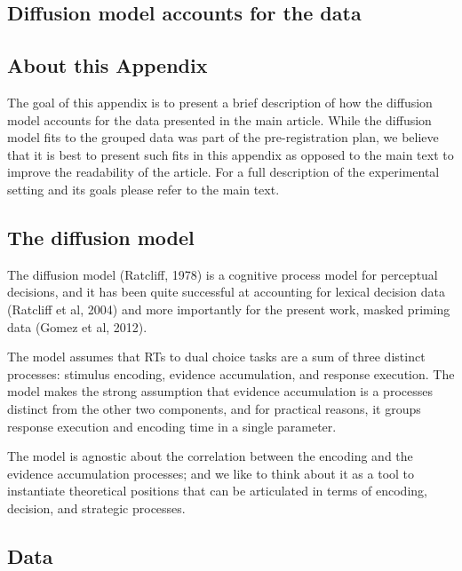 \documentclass[
  english,
  man]{apa6}
\begin{document}
\begin{appendix}
\hypertarget{diffusion-model-accounts-for-the-data}{%
\section{Diffusion model accounts for the
data}\label{diffusion-model-accounts-for-the-data}}

\hypertarget{about-this-appendix}{%
\subsection{About this Appendix}\label{about-this-appendix}}

The goal of this appendix is to present a brief description of how the
diffusion model accounts for the data presented in the main article.
While the diffusion model fits to the grouped data was part of the
pre-registration plan, we believe that it is best to present such fits
in this appendix as opposed to the main text to improve the readability
of the article. For a full description of the experimental setting and
its goals please refer to the main text.

\hypertarget{the-diffusion-model}{%
\subsection{The diffusion model}\label{the-diffusion-model}}

The diffusion model (Ratcliff, 1978) is a cognitive process model for
perceptual decisions, and it has been quite successful at accounting for
lexical decision data (Ratcliff et al, 2004) and more importantly for
the present work, masked priming data (Gomez et al, 2012).

The model assumes that RTs to dual choice tasks are a sum of three
distinct processes: stimulus encoding, evidence accumulation, and
response execution. The model makes the strong assumption that evidence
accumulation is a processes distinct from the other two components, and
for practical reasons, it groups response execution and encoding time in
a single parameter.

The model is agnostic about the correlation between the encoding and the
evidence accumulation processes; and we like to think about it as a tool
to instantiate theoretical positions that can be articulated in terms of
encoding, decision, and strategic processes.

\hypertarget{data}{%
\subsection{Data}\label{data}}


\end{appendix}
\end{document}

